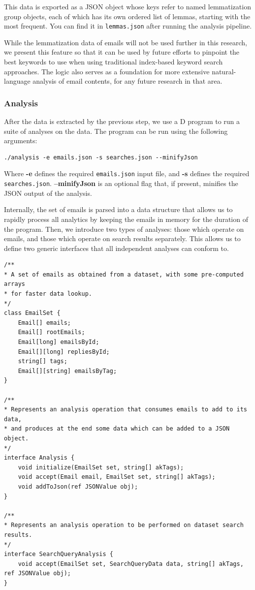 \documentclass[a4paper, 12pt]{article}
\begin{document}
			This data is exported as a JSON object whose keys refer to named lemmatization group objects, each of which has its own ordered list of lemmas, starting with the most frequent. You can find it in \texttt{lemmas.json} after running the analysis pipeline.
		
			While the lemmatization data of emails will not be used further in this research, we present this feature so that it can be used by future efforts to pinpoint the best keywords to use when using traditional index-based keyword search approaches. The logic also serves as a foundation for more extensive natural-language analysis of email contents, for any future research in that area.
			
		\newpage
		\subsubsection{Analysis}
			After the data is extracted by the previous step, we use a D program to run a suite of analyses on the data. The program can be run using the following arguments:
			
			\begin{verbatim}
./analysis -e emails.json -s searches.json --minifyJson
			\end{verbatim}
			
			Where \textbf{-e} defines the required \texttt{emails.json} input file, and \textbf{-s} defines the required \texttt{searches.json}. \textbf{--minifyJson} is an optional flag that, if present, minifies the JSON output of the analysis.
			
			Internally, the set of emails is parsed into a data structure that allows us to rapidly process all analytics by keeping the emails in memory for the duration of the program. Then, we introduce two types of analyses: those which operate on emails, and those which operate on search results separately. This allows us to define two generic interfaces that all independent analyses can conform to.
			
			\begin{verbatim}
/** 
* A set of emails as obtained from a dataset, with some pre-computed arrays
* for faster data lookup.
*/
class EmailSet {
	Email[] emails;
	Email[] rootEmails;
	Email[long] emailsById;
	Email[][long] repliesById;
	string[] tags;
	Email[][string] emailsByTag;
}

/** 
* Represents an analysis operation that consumes emails to add to its data,
* and produces at the end some data which can be added to a JSON object.
*/
interface Analysis {
	void initialize(EmailSet set, string[] akTags);
	void accept(Email email, EmailSet set, string[] akTags);
	void addToJson(ref JSONValue obj);
}

/** 
* Represents an analysis operation to be performed on dataset search results.
*/
interface SearchQueryAnalysis {
	void accept(EmailSet set, SearchQueryData data, string[] akTags, ref JSONValue obj);
}
			\end{verbatim}
		
\end{document}
